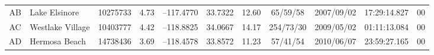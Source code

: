 \begin{table*}
\begin{tabular}[t]{@{} c l r c r@{, }l r c c c r}
		AB	& Lake Elsinore			&	10275733	&	4.73	&	--117.4770	&	33.7322	&	12.60	&	 65/59/58	&	2007/09/02	&	17:29:14.827	&	00	\\ %
																					
		AC	& Westlake Village		&	10403777	&	4.42	&	--118.8825	&	34.0667	&	14.17	&	254/73/30	&	2009/05/02	&	01:11:13.084	&	00	\\ %
																					
		AD	& Hermosa Beach			&	14738436	&	3.69	&	--118.4578	&	33.8572	&	11.23	&	 57/41/54	&	2010/06/07	&	23:59:27.165	&	00	\\ %
	\hline
	\end{tabular}
	\label{tab:events}
\end{table*}


